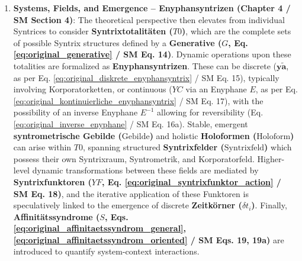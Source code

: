 \documentclass[12pt]{article}
\newcommand{\syntrixtotalitaet}{T0}
\newcommand{\generative}{G}
\newcommand{\syntrixfeld}{\text{Syntrixfeld}}
\newcommand{\diskreteEnyphansyntrix}{\bm{y\widetilde{a}}}
\newcommand{\kontinuierlicheEnyphansyntrix}{YC}
\newcommand{\enyphane}{E}
\newcommand{\syntrometrischesGebilde}{\text{Gebilde}}
\newcommand{\holoform}{\text{Holoform}}
\newcommand{\syntrixfunktor}{YF}
\newcommand{\affinitaetssyndrom}{S}
\newcommand{\zeitkorn}{\delta t_i}
\begin{document}
\begin{enumerate}
    \item \textbf{Systems, Fields, and Emergence – Enyphansyntrizen (Chapter 4 / SM Section 4)}: The theoretical perspective then elevates from individual Syntrices to consider \textbf{Syntrixtotalitäten (\( \syntrixtotalitaet \))}, which are the complete sets of possible Syntrix structures defined by a \textbf{Generative (\( \generative \), Eq. \eqref{eq:original_generative} / SM Eq. 14)}. Dynamic operations upon these totalities are formalized as \textbf{Enyphansyntrizen}. These can be discrete (\( \diskreteEnyphansyntrix \), as per Eq. \eqref{eq:original_diskrete_enyphansyntrix} / SM Eq. 15), typically involving Korporatorketten, or continuous (\( \kontinuierlicheEnyphansyntrix \) via an Enyphane \( \enyphane \), as per Eq. \eqref{eq:original_kontinuierliche_enyphansyntrix} / SM Eq. 17), with the possibility of an inverse Enyphane \( \enyphane^{-1} \) allowing for reversibility (Eq. \eqref{eq:original_inverse_enyphane} / SM Eq. 16a). Stable, emergent \textbf{syntrometrische Gebilde (\(\syntrometrischesGebilde\))} and holistic \textbf{Holoformen (\(\holoform\))} can arise within \( \syntrixtotalitaet \), spanning structured \textbf{Syntrixfelder (\(\syntrixfeld\))} which possess their own Syntrixraum, Syntrometrik, and Korporatorfeld. Higher-level dynamic transformations between these fields are mediated by \textbf{Syntrixfunktoren (\( \syntrixfunktor \), Eq. \eqref{eq:original_syntrixfunktor_action} / SM Eq. 18)}, and the iterative application of these Funktoren is speculatively linked to the emergence of discrete \textbf{Zeitkörner (\(\zeitkorn\))}. Finally, \textbf{Affinitätssyndrome (\( \affinitaetssyndrom \), Eqs. \eqref{eq:original_affinitaetssyndrom_general}, \eqref{eq:original_affinitaetssyndrom_oriented} / SM Eqs. 19, 19a)} are introduced to quantify system-context interactions.


\end{enumerate}
\end{document}
